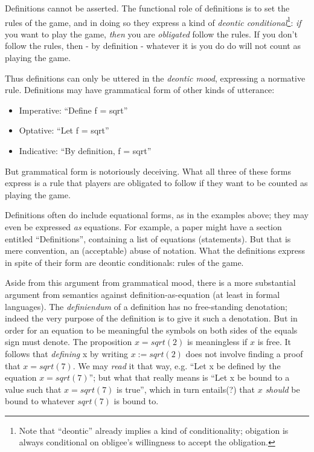 \documentclass{article}
\begin{document}
Definitions cannot be asserted. The functional role of definitions is
to set the rules of the game, and in doing so they express a kind of
\textit{deontic conditional}\footnote{Note that ``deontic'' already
implies a kind of conditionality; obigation is always conditional on
obligee's willingness to accept the obligation.}: \textit{if} you want
to play the game, \textit{then} you are \textit{obligated} follow the
rules. If you don't follow the rules, then - by definition - whatever
it is you do do will not count as playing the game.

Thus definitions can only be uttered in the \textit{deontic mood},
expressing a normative rule. Definitions may have grammatical form of
other kinds of utterance:

\begin{itemize}
\item Imperative: ``Define f = sqrt''
\item Optative: ``Let  f = sqrt''
\item Indicative: ``By definition, f = sqrt''
\end{itemize}

But grammatical form is notoriously deceiving. What all three of these
forms express is a rule that players are obligated to follow if they
want to be counted as playing the game.

Definitions often do include equational forms, as in the examples
above; they may even be expressed \textit{as} equations. For example,
a paper might have a section entitled ``Definitions'', containing a
list of equations (statements). But that is mere convention, an
(acceptable) abuse of notation. What the definitions express in spite
of their form are deontic conditionals: rules of the game.

Aside from this argument from grammatical mood, there is a more
substantial argument from semantics against definition-as-equation (at
least in formal languages). The \textit{definiendum} of a definition
has no free-standing denotation; indeed the very purpose of the
definition is to give it such a denotation. But in order for an
equation to be meaningful the symbols on both sides of the equals sign
must denote. The proposition \(x = sqrt(2)\) is meaningless if \(x\)
is free. It follows that \textit{defining} x by writing \(x :=
sqrt(2)\) does not involve finding a proof that \(x = sqrt(7)\). We
may \textit{read} it that way, e.g. ``Let x be defined by the equation
\(x = sqrt(7)\)''; but what that really means is ``Let x be bound to a
value such that \(x = sqrt(7)\) is true'', which in turn entails(?)
that \(x\) \textit{should} be bound to whatever \(sqrt(7)\) is bound
to.
\end{document}
